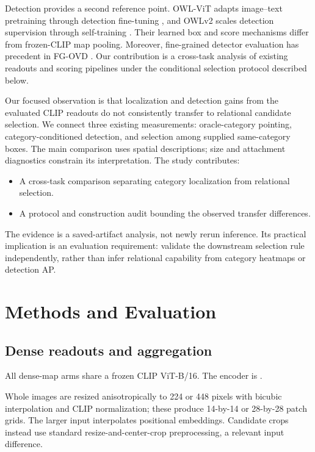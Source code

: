 \documentclass[10pt,twocolumn,letterpaper]{article}
\providecommand{\tightlist}{\setlength{\itemsep}{0pt}\setlength{\parskip}{0pt}}
\begin{document}
Detection provides a second reference point. OWL-ViT adapts image--text
pretraining through detection fine-tuning \citep{minderer2022owlvit},
and OWLv2 scales detection supervision through self-training
\citep{minderer2023owlv2}. Their learned box and score mechanisms differ
from frozen-CLIP map pooling. Moreover, fine-grained detector evaluation
has precedent in FG-OVD \citep{bianchi2023fgovd}. Our contribution is a
cross-task analysis of existing readouts and scoring pipelines under the
conditional selection protocol described below.

Our focused observation is that localization and detection gains from
the evaluated CLIP readouts do not consistently transfer to relational
candidate selection. We connect three existing measurements:
oracle-category pointing, category-conditioned detection, and selection
among supplied same-category boxes. The main comparison uses spatial
descriptions; size and attachment diagnostics constrain its
interpretation. The study contributes:

\begin{itemize}
\tightlist
\item
  A cross-task comparison separating category localization from
  relational selection.
\item
  A protocol and construction audit bounding the observed transfer
  differences.
\end{itemize}

The evidence is a saved-artifact analysis, not newly rerun inference.
Its practical implication is an evaluation requirement: validate the
downstream selection rule independently, rather than infer relational
capability from category heatmaps or detection AP.

\section{Methods and Evaluation}\label{methods-and-evaluation}

\subsection{Dense readouts and
aggregation}\label{dense-readouts-and-aggregation}

All dense-map arms share a frozen CLIP ViT-B/16. The encoder is
.

Whole images are resized anisotropically to 224 or 448 pixels with
bicubic interpolation and CLIP normalization; these produce 14-by-14 or
28-by-28 patch grids. The larger input interpolates positional
embeddings. Candidate crops instead use standard resize-and-center-crop
preprocessing, a relevant input difference.
\end{document}
